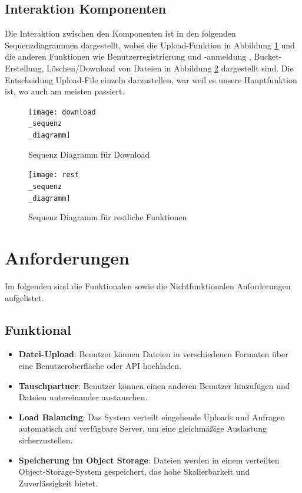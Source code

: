 \documentclass[12pt]{report}
\begin{document}
		\subsection{Interaktion Komponenten}
			Die Interaktion zwischen den Komponenten ist in den folgenden Sequenzdiagrammen dargestellt, wobei die Upload-Funktion in Abbildung \ref{fig:download_sequenz_diagramm} und die anderen Funktionen wie Benutzerregistrierung und -anmeldung , Bucket-Erstellung, Löschen/Download von Dateien in Abbildung \ref{fig:rest_sequenz_diagramm} dargestellt sind. Die Entscheidung Upload-File einzeln darzustellen, war weil es unsere Hauptfunktion ist, wo auch am meisten passiert.
			
			\begin{figure}[h]
				\centering
				\texttt{[image: download\\\_sequenz\\\_diagramm]}
				\caption{Sequenz Diagramm für Download}
				\label{fig:download_sequenz_diagramm}
			\end{figure}
			
			\begin{figure}[h]
				\centering
				\texttt{[image: rest\\\_sequenz\\\_diagramm]}
				\caption{Sequenz Diagramm für restliche Funktionen}
				\label{fig:rest_sequenz_diagramm}
			\end{figure}
		
	\section{Anforderungen}
		Im folgenden sind die Funktionalen sowie die Nichtfunktionalen Anforderungen aufgelistet.
		\subsection{Funktional}
			\begin{itemize}
				\item \textbf{Datei-Upload}: Benutzer können Dateien in verschiedenen Formaten über eine Benutzeroberfläche oder API hochladen.
				\item \textbf{Tauschpartner}: Benutzer können einen anderen Benutzer hinzufügen und Dateien untereinander austauschen.
				\item \textbf{Load Balancing}: Das System verteilt eingehende Uploads und Anfragen automatisch auf verfügbare Server, um eine gleichmäßige Auslastung sicherzustellen.
				\item \textbf{Speicherung im Object Storage}: Dateien werden in einem verteilten Object-Storage-System gespeichert, das hohe Skalierbarkeit und Zuverlässigkeit bietet.
			\end{itemize}
\end{document}
